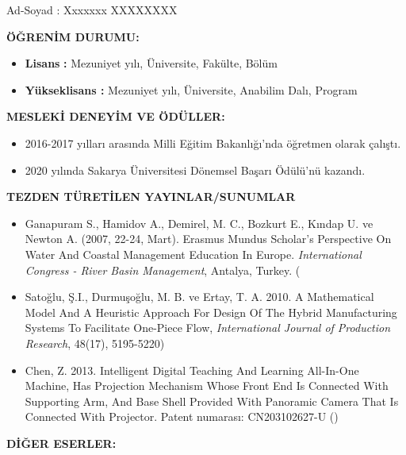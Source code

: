 \begin{ozgecmis}
Ad-Soyad\quad{}\quad{}  :    Xxxxxxx XXXXXXXX

\textbf{ÖĞRENİM DURUMU:}

\begin{itemize}
  \item \textbf{Lisans}\quad{}\textbf{            :} Mezuniyet yılı, Üniversite, Fakülte, Bölüm

  \item \textbf{Yükseklisans       :} Mezuniyet yılı, Üniversite, Anabilim Dalı, Program

\end{itemize}
\textbf{MESLEKİ DENEYİM VE ÖDÜLLER:}

\begin{itemize}
  \item 2016-2017 yılları arasında Milli Eğitim Bakanlığı’nda öğretmen olarak çalıştı.

  \item 2020 yılında Sakarya Üniversitesi Dönemsel Başarı Ödülü’nü kazandı.

\end{itemize}
\textbf{TEZDEN TÜRETİLEN YAYINLAR/SUNUMLAR}

\begin{itemize}
  \item Ganapuram S., Hamidov A., Demirel, M. C., Bozkurt E., Kındap U. ve Newton A. (2007, 22-24, Mart). Erasmus Mundus Scholar's Perspective On Water And Coastal Management Education In Europe. \textit{International Congress - River Basin Management}, Antalya, Turkey. (

  \item Satoğlu, Ş.I., Durmuşoğlu, M. B. ve Ertay, T. A. 2010. A Mathematical Model And A Heuristic Approach For Design Of The Hybrid Manufacturing Systems To Facilitate One-Piece Flow, \textit{International Journal of Production Research}, 48(17), 5195-5220)

  \item Chen, Z. 2013. Intelligent Digital Teaching And Learning All-In-One Machine, Has Projection Mechanism Whose Front End Is Connected With Supporting Arm, And Base Shell Provided With Panoramic Camera That Is Connected With Projector. Patent numarası: CN203102627-U  ()

\end{itemize}
\textbf{DİĞER ESERLER:}
\end{ozgecmis}
